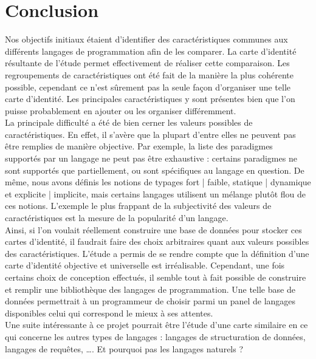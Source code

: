\section{Conclusion}

Nos objectifs initiaux étaient d'identifier des caractéristiques communes aux différents langages de programmation afin de les comparer. La carte d'identité résultante de l'étude permet effectivement de réaliser cette comparaison. Les regroupements de caractéristiques ont été fait de la manière la plus cohérente possible, cependant ce n'est sûrement pas la seule façon d'organiser une telle carte d'identité. Les principales caractéristiques y sont présentes bien que l'on puisse probablement en ajouter ou les organiser différemment.\\

La principale difficulté a été de bien cerner les valeurs possibles de caractéristiques. En effet, il s'avère que la plupart d'entre elles ne peuvent pas être remplies de manière objective. Par exemple, la liste des paradigmes supportés par un langage ne peut pas être exhaustive : certains paradigmes ne sont supportés que partiellement, ou sont spécifiques au langage en question. De même, nous avons définis les notions de typages fort | faible, statique | dynamique et explicite | implicite, mais certains langages utilisent un mélange plutôt flou de ces notions. L'exemple le plus frappant de la subjectivité des valeurs de caractéristiques est la mesure de la popularité d'un langage.\\

Ainsi, si l'on voulait réellement construire une base de données pour stocker ces cartes d'identité, il faudrait faire des choix arbitraires quant aux valeurs possibles des caractéristiques. L'étude a permis de se rendre compte que la définition d'une carte d'identité objective et universelle est irréalisable. Cependant, une fois certains choix de conception effectués, il semble tout à fait possible de construire et remplir une bibliothèque des langages de programmation. Une telle base de données permettrait à un programmeur de choisir parmi un panel de langages disponibles celui qui correspond le mieux à ses attentes.\\

Une suite intéressante à ce projet pourrait être l'étude d'une carte similaire en ce qui concerne les autres types de langages : langages de structuration de données, langages de requêtes, …. Et pourquoi pas les langages naturels ?